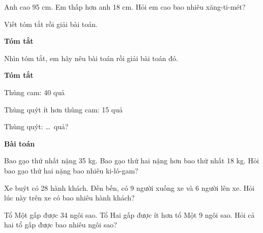 \documentclass[../main.tex]{subfiles}
\begin{document}
\begin{bt}
    Anh cao 95 cm. Em thấp hơn anh 18 cm. Hỏi em cao bao nhiêu xăng-ti-mét?\par
    Viết tóm tắt rồi giải bài toán.
    \par\nopagebreak\vspace{4pt}\nopagebreak
    \noindent\begin{minipage}[t]{0.42\linewidth}
        \textbf{Tóm tắt}
    \end{minipage}\hfill
    \begin{minipage}[t]{0.54\linewidth}
    \end{minipage}
\end{bt}
\newpage
\begin{bt}
    Nhìn tóm tắt, em hãy nêu bài toán rồi giải bài toán đó.
    \par\nopagebreak\vspace{4pt}\nopagebreak
    \noindent\begin{minipage}[t]{0.42\linewidth}
        \textbf{Tóm tắt}\par\vspace{6pt}
        Thùng cam: 40 quả\par\vspace{6pt}
        Thùng quýt ít hơn thùng cam: 15 quả\par\vspace{6pt}
        Thùng quýt: \dots\ quả?
    \end{minipage}\hfill
    \begin{minipage}[t]{0.54\linewidth}
        \textbf{Bài toán}
    \end{minipage}
\end{bt}
\begin{bt}
    Bao gạo thứ nhất nặng 35 kg. Bao gạo thứ hai nặng hơn bao thứ nhất 18 kg. Hỏi bao gạo thứ hai nặng bao nhiêu ki-lô-gam?
\end{bt}

\begin{bt}
    Xe buýt có 28 hành khách. Đến bến, có 9 người xuống xe và 6 người lên xe. Hỏi lúc này trên xe có bao nhiêu hành khách?
\end{bt}

\begin{bt}
    Tổ Một gấp được 34 ngôi sao. Tổ Hai gấp được ít hơn tổ Một 9 ngôi sao. Hỏi cả hai tổ gấp được bao nhiêu ngôi sao?
\end{bt}
\end{document}
